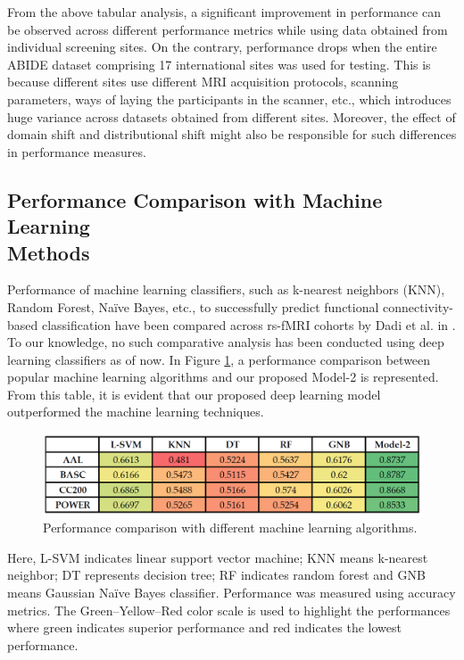 From the above tabular analysis, a significant improvement in performance can be observed across different performance metrics while using data obtained from individual screening sites. On the contrary, performance drops when the entire ABIDE dataset comprising 17 international sites was used for testing. This is because different sites use different MRI acquisition protocols, scanning parameters, ways of laying the participants in the scanner, etc., which introduces huge variance across datasets obtained from different sites. Moreover, the effect of domain shift and distributional shift might also be responsible for such differences in performance measures.

\subsection{Performance Comparison with Machine Learning\\ Methods}
Performance of machine learning classifiers, such as k-nearest neighbors (KNN), Random Forest, Naïve Bayes, etc., to successfully predict functional connectivity-based classification have been compared across rs-fMRI cohorts by Dadi et al. in \cite{dadi2019benchmarking}. To our knowledge, no such comparative analysis has been conducted using deep learning classifiers as of now. In Figure \ref{fig:4.10}, a performance comparison between popular machine learning algorithms and our proposed Model-2 is represented. From this table, it is evident that our proposed deep learning model outperformed the machine learning techniques.


\begin{figure}[h!]
\centering
\includegraphics[width=\textwidth]{figures/Figure 4.10.png}
\caption{Performance comparison with different machine learning algorithms.}
\label{fig:4.10}
\end{figure}

Here, L-SVM indicates linear support vector machine; KNN means k-nearest neighbor; DT represents decision tree; RF indicates random forest and GNB means Gaussian Naïve Bayes classifier. Performance was measured using accuracy metrics. The Green–Yellow–Red color scale is used to highlight the performances where green indicates superior performance and red indicates the lowest performance.

